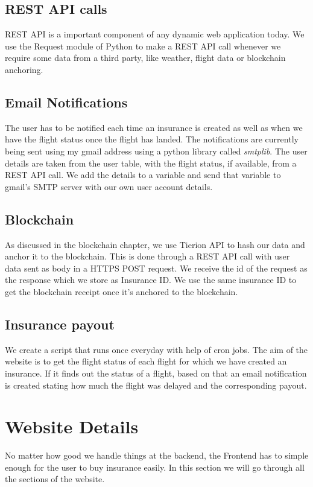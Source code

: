 \subsection{REST API calls}
REST API is a important component of any dynamic web application today. We use the Request module of Python to make a REST API call whenever we require some data from a third party, like weather, flight data or blockchain anchoring.

\subsection{Email Notifications}
The user has to be notified each time an insurance is created as well as when we have the flight status once the flight has landed. The notifications are currently being sent using my gmail address using a python library called \textit{smtplib}. The user details are taken from the user table, with the flight status, if available, from a REST API call. We add the details to a variable and send that variable to gmail's SMTP server with our own user account details.

\subsection{Blockchain}
As discussed in the blockchain chapter, we use Tierion API to hash our data and anchor it to the blockchain. This is done through a REST API call with user data sent as body in a HTTPS POST request. We receive the id of the request as the response which we store as Insurance ID. We use the same insurance ID to get the blockchain receipt once it's anchored to the blockchain.

\subsection{Insurance payout}
We create a script that runs once everyday with help of cron jobs. The aim of the website is to get the flight status of each flight for which we have created an insurance. If it finds out the status of a flight, based on that an email notification is created stating how much the flight was delayed and the corresponding payout. 

\section{Website Details}
No matter how good we handle things at the backend, the Frontend has to simple enough for the user to buy insurance easily. In this section we will go through all the sections of the website. 

